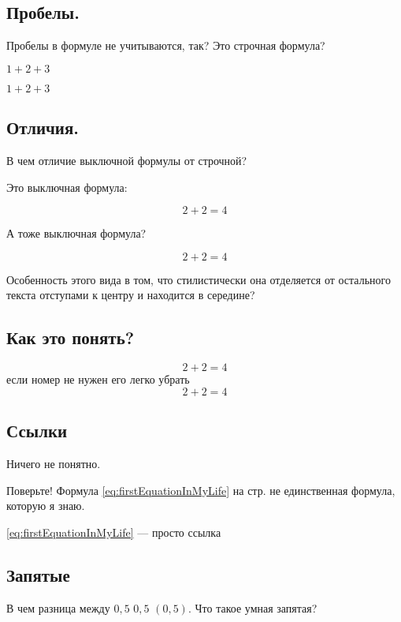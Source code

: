 \documentclass[a4paper,12pt]{article} %
\begin{document}
	\subsection{Пробелы.}
	Пробелы в формуле не учитываются, так? Это строчная формула?
	
	$1+2+3$
	
	$ 1 + 2 + 3 $
	
	\subsection{Отличия.}
	В чем отличие выключной формулы от строчной?
	
	Это выключная формула:
	
	\[ 2+      2=  4 \]
	
	А тоже выключная формула?
	
	$$2+2=4$$
	
	Особенность этого вида в том, что стилистически она отделяется от остального текста отступами к центру и находится в середине?
	
	\subsection{Как это понять?}
		\begin{equation}\label{eq:firstEquationInMyLife}
			2+2=4
		\end{equation}
		если номер не нужен его легко убрать
		\begin{equation*}
			2+2=4
		\end{equation*}
	
	\subsection{Ссылки}
	Ничего не понятно.
	
	
	Поверьте! Формула \eqref{eq:firstEquationInMyLife} на стр. \pageref{eq:firstEquationInMyLife} не единственная формула, которую я знаю.
	
	\ref{eq:firstEquationInMyLife} --- просто ссылка
	
	\subsection{Запятые}
	В чем разница между 
	$0{,}5$
	$0,   5$  $(0, 5)$. %
	Что такое умная запятая?
	
	
\end{document}
